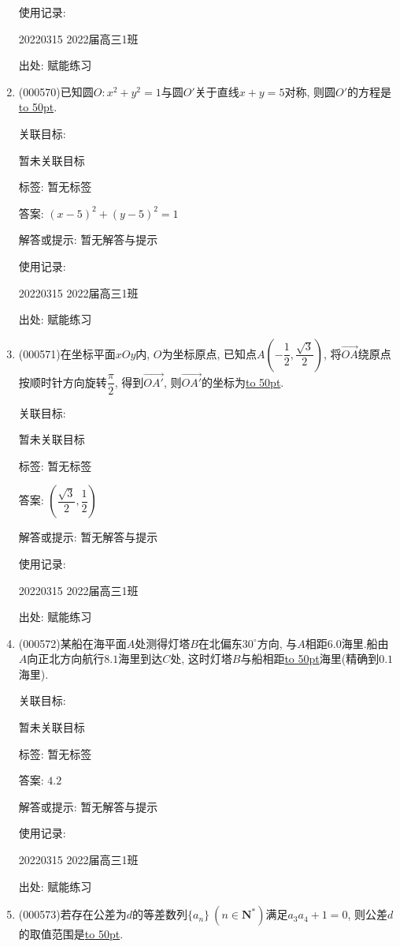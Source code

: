 \documentclass[10pt,a4paper]{article}
\newcommand{\blank}[1]{\underline{\hbox to #1pt{}}}
\begin{document}
\begin{enumerate}[1.]
使用记录:

20220315	2022届高三1班	


出处: 赋能练习
\item { (000570)}已知圆$O:x^2+y^2=1$与圆$O'$关于直线$x+y=5$对称, 则圆$O'$的方程是\blank{50}.


关联目标:

暂未关联目标



标签: 暂无标签

答案: $(x-5)^2+(y-5)^2=1$

解答或提示: 暂无解答与提示

使用记录:

20220315	2022届高三1班	


出处: 赋能练习
\item { (000571)}在坐标平面$xOy$内, $O$为坐标原点, 已知点$A(-\dfrac12,\dfrac{\sqrt3}2)$, 将$\overrightarrow{OA}$绕原点按顺时针方向旋转$\dfrac{\pi}2$, 得到$\overrightarrow{OA'}$, 则$\overrightarrow{OA'}$的坐标为\blank{50}.


关联目标:

暂未关联目标



标签: 暂无标签

答案: $(\dfrac{\sqrt 3}2,\dfrac 12)$

解答或提示: 暂无解答与提示

使用记录:

20220315	2022届高三1班	


出处: 赋能练习
\item { (000572)}某船在海平面$A$处测得灯塔$B$在北偏东$30^\circ$方向, 与$A$相距$6.0$海里.船由$A$向正北方向航行$8.1$海里到达$C$处, 这时灯塔$B$与船相距\blank{50}海里(精确到$0.1$海里).


关联目标:

暂未关联目标



标签: 暂无标签

答案: $4.2$

解答或提示: 暂无解答与提示

使用记录:

20220315	2022届高三1班	


出处: 赋能练习
\item { (000573)}若存在公差为$d$的等差数列$\{a_n\} \ (n\in \mathbf{N}^*)$满足$a_3a_4+1=0$, 则公差$d$的取值范围是\blank{50}.



\end{enumerate}
\end{document}
